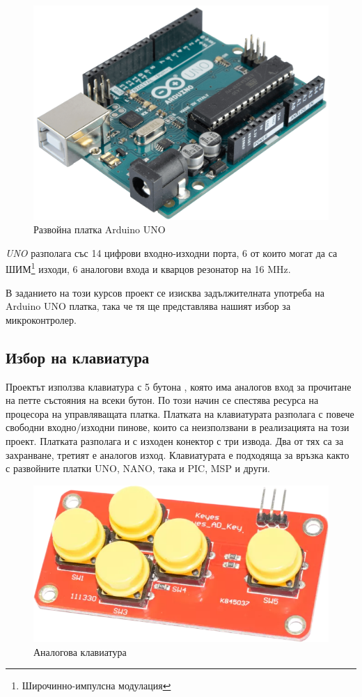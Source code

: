 \documentclass[titlepage, oneside, 12pt]{book}
\newcommand{\ard}{Arduino\texttrademark{}}
\begin{document}
\begin{figure}[h!]
    \centering
    \includegraphics[width=0.5\linewidth]{img/arduino.png}
    \caption{Развойна платка \ard{} UNO}
\end{figure}

\textit{UNO} разполага със 14 цифрови входно-изходни порта, 6 от които могат да
са ШИМ\footnote{Широчинно-импулсна модулация} изходи, 6 аналогови входа и
кварцов резонатор на 16 MHz.

В заданието на този курсов проект се изисква задължителната употреба на \ard{} UNO
платка, така че тя ще представлява нашият избор за микроконтролер.

\subsection{Избор на клавиатура}

Проектът използва клавиатура с 5 бутона \cite{keypads}, която има аналогов вход за
прочитане на петте състояния на всеки бутон. По този начин се спестява ресурса
на процесора на управляващата платка. Платката на клавиатурата разполага с повече свободни входно/изходни
пинове, които са неизползвани в реализацията на този проект. Платката
разполага и с изходен конектор с три извода. Два от тях са за захранване, третият
е аналогов изход. Клавиатурата е подходяща за връзка както с развойните платки
UNO, NANO, така и PIC, MSP и други.

\begin{figure}[h!]
    \centering
    \includegraphics[width=0.5\linewidth]{img/keypad.png}
    \caption{Аналогова клавиатура}
\end{figure}
\end{document}
